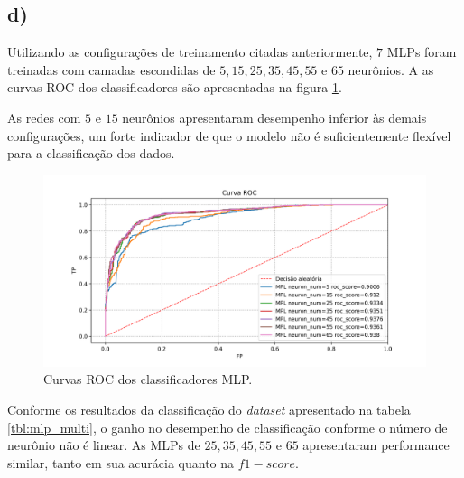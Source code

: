\documentclass{article}
\begin{document}
    \subsection*{d)}
    Utilizando as configurações de treinamento citadas anteriormente,
    $7$ MLPs foram treinadas com camadas escondidas de $5, 15, 25, 35, 45, 55$ e $65$ neurônios.
    A as curvas ROC dos classificadores são apresentadas na figura \ref{fig:mpl_roc_multi}. 
    
    As redes com $5$ e $15$ neurônios apresentaram desempenho inferior às demais configurações, um forte indicador de que o modelo
    não é suficientemente flexível para a classificação dos dados.
    
    \begin{figure}[H]
        \centering
        \includegraphics[width=\linewidth]{mlp_roc_multi.png}   
        \caption{Curvas ROC dos classificadores MLP.}
        \label{fig:mpl_roc_multi}
    \end{figure}

    Conforme os resultados da classificação do \textit{dataset} apresentado na tabela \ref{tbl:mlp_multi}, o ganho no desempenho
    de classificação conforme o número de neurônio não é linear. As MLPs de $25, 35, 45,55$ e $65$ apresentaram performance similar,
    tanto em sua acurácia quanto na $f1-score$.
    
\end{document}
